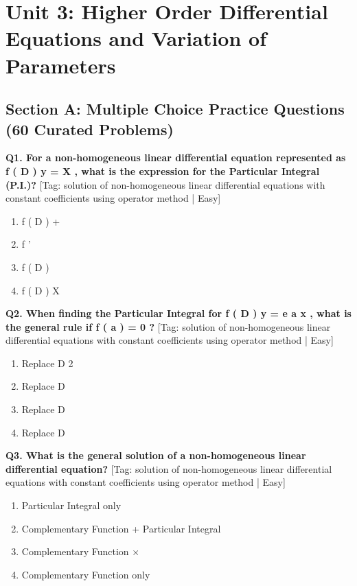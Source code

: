 \chapter{Unit 3: Higher Order Differential Equations and Variation of Parameters}

\section{Section A: Multiple Choice Practice Questions (60 Curated Problems)}

\noindent\textbf{Q1. For a non-homogeneous linear differential equation represented as f ( D ) y = X , what is the expression for the Particular Integral (P.I.)?} \hfill [Tag: solution of non-homogeneous linear differential equations with constant coefficients using operator method | Easy]
\begin{enumerate}[label=(\alph*),topsep=2pt,itemsep=1pt,partopsep=0pt,parsep=0pt]
    \item {{f ( D ) +}}
    \item {{f '}}
    \item {{f ( D )}}
    \item {{f ( D ) X}}
\end{enumerate}
\vspace{2mm}

\noindent\textbf{Q2. When finding the Particular Integral for f ( D ) y = e a x , what is the general rule if f ( a )  = 0 ?} \hfill [Tag: solution of non-homogeneous linear differential equations with constant coefficients using operator method | Easy]
\begin{enumerate}[label=(\alph*),topsep=2pt,itemsep=1pt,partopsep=0pt,parsep=0pt]
    \item {{Replace D 2}}
    \item {{Replace D}}
    \item {{Replace D}}
    \item {{Replace D}}
\end{enumerate}
\vspace{2mm}

\noindent\textbf{Q3. What is the general solution of a non-homogeneous linear differential equation?} \hfill [Tag: solution of non-homogeneous linear differential equations with constant coefficients using operator method | Easy]
\begin{enumerate}[label=(\alph*),topsep=2pt,itemsep=1pt,partopsep=0pt,parsep=0pt]
    \item {{Particular Integral only}}
    \item {{Complementary Function + Particular Integral}}
    \item {{Complementary Function $\times$}}
    \item {{Complementary Function only}}
\end{enumerate}
\vspace{2mm}

